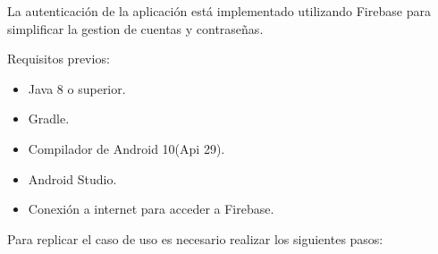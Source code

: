 \documentclass[12pt]{report}
\begin{document}
La autenticación de la aplicación está implementado utilizando Firebase para simplificar la gestion de cuentas y contraseñas.

\begin{description}
\item Requisitos previos:
	\begin{itemize}
	\item Java 8 o superior.
	\item Gradle.
	\item Compilador de Android 10(Api 29).
	\item Android Studio.
	\item Conexión a internet para acceder a Firebase.
	\end{itemize}
\end{description}

Para replicar el caso de uso es necesario realizar los siguientes pasos: 
\end{document}
